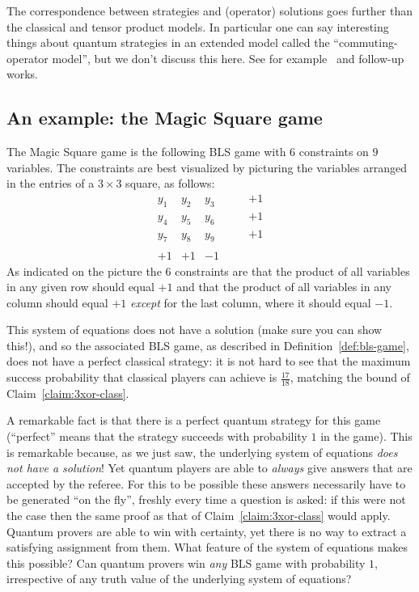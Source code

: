 \begin{remark}
The correspondence between strategies and (operator) solutions goes further than the classical and tensor product models. In particular one can say interesting things about quantum strategies in an extended model called the ``commuting-operator model'', but we don't discuss this here. See for example~\cite{cleve2017perfect} and follow-up works. 
\end{remark}

\subsection{An example: the Magic Square game}
\label{sec:ms-game}

The Magic Square game is the following BLS game with $6$ constraints on $9$ variables. The constraints are best visualized by picturing the variables arranged in the entries of a $3\times 3$ square, as follows: 
\[ \begin{matrix} y_1 & y_2 & y_3 & \quad & +1 \\  y_4 & y_5 & y_6 & \quad & +1 \\  y_7 & y_8 & y_9 & \quad & +1 \\ &&&&\\  +1 & +1 & -1 &  & \end{matrix}\]
As indicated on the picture the $6$ constraints are that the product of all variables in any given row should equal $+1$ and that the product of all variables in any column should equal $+1$ \emph{except} for the last column, where it should equal $-1$. 

This system of equations does not have a solution (make sure you can show this!), and so the associated  BLS game, as described in Definition~\ref{def:bls-game}, does not have a perfect classical strategy: it is not hard to see that the maximum success probability that classical players can achieve is $\frac{17}{18}$, matching the bound of Claim~\ref{claim:3xor-class}. 

A remarkable fact is that there is a perfect quantum strategy for this game (``perfect'' means that the strategy succeeds with probability $1$ in the game).  This is remarkable because, as we just saw, the underlying system of equations \emph{does not have a solution}! Yet quantum players are able to \emph{always} give answers that are accepted by the referee. For this to be possible these answers necessarily have to be generated ``on the fly'', freshly every time a question is asked: if this were not the case then the same proof as that of Claim~\ref{claim:3xor-class} would apply. Quantum provers are able to win with certainty, yet there is no way to extract a satisfying assignment from them. What feature of the system of equations makes this possible? Can quantum provers win \emph{any} BLS game with probability $1$, irrespective of any truth value of the underlying system of equations? 

